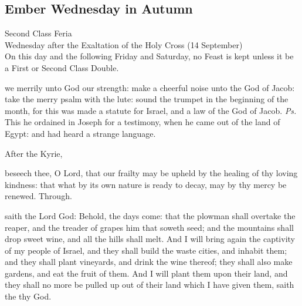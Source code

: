\subsection{Ember Wednesday in Autumn}
\begin{inhead}
    {Second Class Feria\\
Wednesday after the Exaltation of the Holy Cross (14 September)\\
On this day and the following Friday and Saturday, no Feast is kept unless it be a First or Second Class Double.}
\end{inhead}

\introit
{} we merrily unto God our strength: make a cheerful noise unto the God of Jacob: take the merry psalm with the lute: sound the trumpet in the beginning of the month, for this was made a statute for Israel, and a law of the God of Jacob. \textit{Ps.} This he ordained in Joseph for a testimony, when he came out of the land of Egypt: and had heard a strange language.
\begin{rubric}
    After the Kyrie,
\end{rubric}

\collect
{} beseech thee, O Lord, that our frailty may be upheld by the healing of thy loving kindness: that what by its own nature is ready to decay, may by thy mercy be renewed. Through.

 saith the Lord God: Behold, the days come: that the plowman shall overtake the reaper, and the treader of grapes him that soweth seed; and the mountains shall drop sweet wine, and all the hills shall melt. And I will bring again the captivity of my people of Israel, and they shall build the waste cities, and inhabit them; and they shall plant vineyards, and drink the wine thereof; they shall also make gardens, and eat the fruit of them. And I will plant them upon their land, and they shall no more be pulled up out of their land which I have given them, saith the  thy God.

\\

